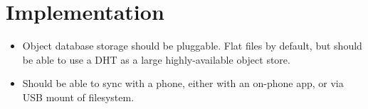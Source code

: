\documentclass[a4paper]{article}
\begin{document}
\section{Implementation}\label{implementation}

\begin{itemize}
  \item
    Object database storage should be pluggable. Flat files by default, but
    should be able to use a DHT as a large highly-available object store.
  \item
    Should be able to sync with a phone, either with an on-phone app, or via USB
    mount of filesystem.
\end{itemize}

\nocite{*}  %


\end{document}
